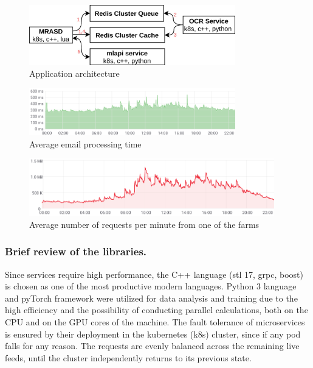 \documentclass[12pt]{jpconf}
\begin{document}
\begin{figure}[h!]
	\center
	\includegraphics[width=0.8\textwidth]{images/deploy.jpg}
	\caption{\label{fig:01} Application architecture}
\end{figure}

\begin{figure}[h!]
	\center
	\includegraphics[width=0.8\textwidth]{images/timings_upd.png}
	\caption{\label{fig:02} Average email processing time}	
\end{figure}
 
\begin{figure}[h!]
	\center
	\includegraphics[width=0.95\textwidth]{images/processed_messages.png}
	\caption{\label{fig:03} Average number of requests per minute from one of the farms}
\end{figure}

\subsubsection*{Brief review of the libraries.}
Since services require high performance, the C++ language (stl 17, grpc, boost) is chosen as one of the most productive modern languages. Python 3 language and pyTorch framework were utilized for data analysis and training due to the high efficiency and the possibility of conducting parallel calculations, both on the CPU and on the GPU cores of the machine.
The fault tolerance of microservices is ensured by their deployment in the kubernetes (k8s) cluster, since if any pod falls for any reason. The requests are evenly balanced across the remaining live feeds, until the cluster independently returns to its previous state. 
\end{document}
